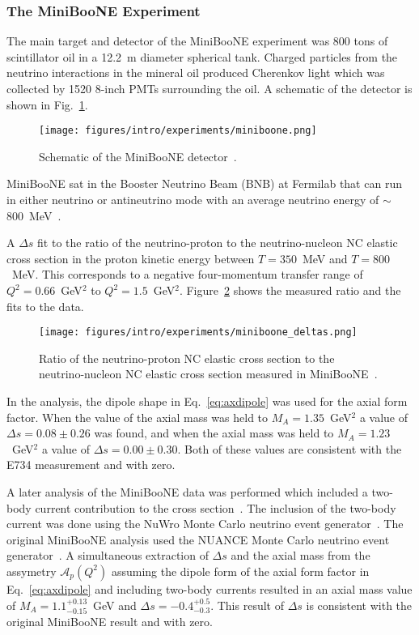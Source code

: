     \subsubsection{The MiniBooNE Experiment}\label{sec:miniboonence}
    The main target and detector of the MiniBooNE experiment was 800 tons of
    scintillator oil in a 12.2~m diameter spherical tank. Charged particles
    from the neutrino interactions in the mineral oil produced Cherenkov light
    which was collected by 1520 8-inch PMTs surrounding the oil. A schematic of
    the detector is shown in Fig.~\ref{fig:miniboonedetector}.
    \begin{figure}[h]
      \centering
      \texttt{[image: figures/intro/experiments/miniboone.png]}
      \caption{Schematic of the MiniBooNE detector~\cite{Cheng:2012yy}.}
      \label{fig:miniboonedetector}
    \end{figure}
    MiniBooNE sat in the Booster Neutrino Beam (BNB) at Fermilab that can run
    in either neutrino or antineutrino mode with an average neutrino energy of
    $\sim$800~MeV~\cite{Aguilar-Arevalo:2008yp}.

    A $\Delta s$ fit to the ratio of the neutrino-proton to the
    neutrino-nucleon NC elastic cross section in the proton kinetic energy
    between $T = 350$~MeV and $T = 800$~MeV. This corresponds to a negative
    four-momentum transfer range of $Q^2 = 0.66$~GeV$^2$ to $Q^2 =
    1.5$~GeV$^2$. Figure~\ref{fig:miniboonedeltas} shows the measured ratio and
    the fits to the data.
    \begin{figure}[h]
      \centering
      \texttt{[image: figures/intro/experiments/miniboone\_deltas.png]}
      \caption{Ratio of the neutrino-proton NC elastic cross section to the
      neutrino-nucleon NC elastic cross section measured in
      MiniBooNE~\cite{Aguilar-Arevalo:2010cx}.}
      \label{fig:miniboonedeltas}
    \end{figure}
    In the analysis, the dipole shape in Eq.~\ref{eq:axdipole} was used for the
    axial form factor. When the value of the axial mass was held to $M_A =
    1.35$~GeV$^2$ a value of $\Delta s = 0.08 \pm 0.26$ was found, and when the
    axial mass was held to $M_A = 1.23$~GeV$^2$ a value of $\Delta s = 0.00 \pm
    0.30$. Both of these values are consistent with the E734 measurement and
    with zero.

    A later analysis of the MiniBooNE data was performed which included a
    two-body current contribution to the cross section~\cite{Golan:2013jtj}.
    The inclusion of the two-body current was done using the NuWro Monte Carlo
    neutrino event generator~\cite{Golan:2012wx}. The original MiniBooNE
    analysis used the NUANCE Monte Carlo neutrino event
    generator~\cite{Casper:2002sd}. A simultaneous extraction of $\Delta s$ and
    the axial mass from the assymetry $\mathcal{A}_p(Q^2)$ assuming the dipole
    form of the axial form factor in Eq.~\ref{eq:axdipole} and including
    two-body currents resulted in an axial mass value of $M_A =
    1.1^{+0.13}_{-0.15}$~GeV and $\Delta s = -0.4^{+0.5}_{-0.3}$. This result
    of $\Delta s$ is consistent with the original MiniBooNE result and with
    zero.

